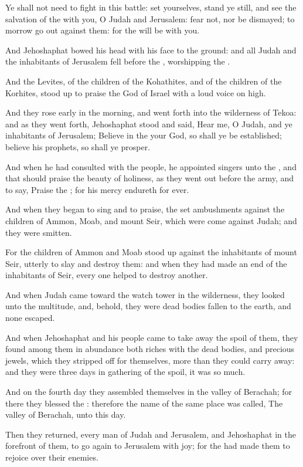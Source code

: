 \verse Ye shall not need to fight in this battle: set yourselves, stand ye still, and see the salvation of the \LORD with you, O Judah and Jerusalem: fear not, nor be dismayed; to morrow go out against them: for the \LORD will be with you.

\verse And Jehoshaphat bowed his head with his face to the ground: and all Judah and the inhabitants of Jerusalem fell before the \LORD, worshipping the \LORD.

\verse And the Levites, of the children of the Kohathites, and of the children of the Korhites, stood up to praise the \LORD God of Israel with a loud voice on high.

\verse And they rose early in the morning, and went forth into the wilderness of Tekoa: and as they went forth, Jehoshaphat stood and said, Hear me, O Judah, and ye inhabitants of Jerusalem; Believe in the \LORD your God, so shall ye be established; believe his prophets, so shall ye prosper.

\verse And when he had consulted with the people, he appointed singers unto the \LORD, and that should praise the beauty of holiness, as they went out before the army, and to say, Praise the \LORD; for his mercy endureth for ever.

\verse And when they began to sing and to praise, the \LORD set ambushments against the children of Ammon, Moab, and mount Seir, which were come against Judah; and they were smitten.

\verse For the children of Ammon and Moab stood up against the inhabitants of mount Seir, utterly to slay and destroy them: and when they had made an end of the inhabitants of Seir, every one helped to destroy another.

\verse And when Judah came toward the watch tower in the wilderness, they looked unto the multitude, and, behold, they were dead bodies fallen to the earth, and none escaped.

\verse And when Jehoshaphat and his people came to take away the spoil of them, they found among them in abundance both riches with the dead bodies, and precious jewels, which they stripped off for themselves, more than they could carry away: and they were three days in gathering of the spoil, it was so much.

\verse And on the fourth day they assembled themselves in the valley of Berachah; for there they blessed the \LORD: therefore the name of the same place was called, The valley of Berachah, unto this day.

\verse Then they returned, every man of Judah and Jerusalem, and Jehoshaphat in the forefront of them, to go again to Jerusalem with joy; for the \LORD had made them to rejoice over their enemies.

